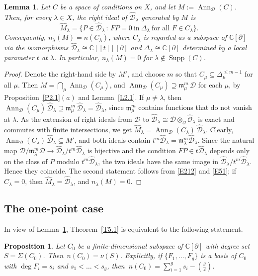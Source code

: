 \documentclass[11pt,reqno]{amsart}
\theoremstyle{plain}
\newtheorem{lemma}{Lemma}[section]
\newtheorem{proposition}{Proposition}[section]
\theoremstyle{definition}
\theoremstyle{remark}
\numberwithin{equation}{section}
\newcommand{\cD}{\mathcal{D}}
\newcommand{\cO}{\mathcal{O}}
\newcommand{\C}{\mathbb{C}}
\newcommand{\del}{\partial}
\newcommand{\fm}{\mathfrak{m}}
\newcommand{\ml}{\mathfrak{m}_\lambda}
\newcommand{\hO}{\widehat{\cO}}
\newcommand{\hD}{\widehat{\cD}}
\newcommand{\Dl}{\Delta_\lambda}
\DeclareMathOperator{\Ann}{Ann}
\DeclareMathOperator{\Supp}{Supp}
\begin{document}
\begin{lemma}
\label{L5.1}
Let $C$ be a space of conditions on $X$, and let $M := \Ann_{\cD}(C)$. Then, for every
$\lambda \in X$, the right ideal of $\hD_\lambda$ generated by $M$ is
\[
  \widehat{M}_\lambda = \{ P \in \hD_\lambda \, : \, F P = 0 \ \text{in}\ \Dl \ \text{for all } F
  \in C_\lambda \} .
\]
Consequently, $n_\lambda(M) = n(C_\lambda)$, where $C_\lambda$ is regarded as a subspace of
$\C[\del]$ via the isomorphisms $\hD_\lambda \cong \C[[t]][\del]$ and $\Dl \cong \C[\del]$
determined by a local parameter $t$ at $\lambda$. In particular, $n_\lambda(M) = 0$ for
$\lambda \notin \Supp(C)$.
\end{lemma}

\begin{proof}
Denote the right-hand side by $M'$, and choose $m$ so that $C_\mu \subseteq \Delta_\mu^{\le m-1}$
for all $\mu$. Then $M = \bigcap_\mu \Ann_{\cD}(C_\mu)$, and $\Ann_{\cD}(C_\mu) \supseteq \fm_\mu^m\, \cD$
for each $\mu$, by Proposition~\ref{P2.1}$(a)$ and Lemma~\ref{L2.1}. If
$\mu \ne \lambda$, then $\Ann_{\cD}(C_\mu)\, \hD_\lambda \supseteq \fm_\mu^m\, \hD_\lambda =
\hD_\lambda$, since $\fm_\mu^m$ contains functions that do not vanish at $\lambda$. As the
extension of right ideals from $\cD$ to $\hD_\lambda \cong \cD \otimes_{\cO} \hO_\lambda$ is
exact and commutes with finite intersections, we get $\widehat{M}_\lambda =
\Ann_{\cD}(C_\lambda)\, \hD_\lambda$. Clearly, $\Ann_{\cD}(C_\lambda)\, \hD_\lambda \subseteq M'$,
and both ideals contain $t^m \hD_\lambda = \ml^m \hD_\lambda$. Since the natural map
$\cD/\ml^m \cD \to \hD_\lambda/t^m \hD_\lambda$ is bijective and the condition $F P \in t
\hD_\lambda$ depends only on the class of $P$ modulo $t^m \hD_\lambda$, the two ideals have the
same image in $\hD_\lambda/t^m \hD_\lambda$. Hence they coincide. The second statement follows
from \eqref{E212} and \eqref{E51}; if $C_\lambda = 0$, then $\widehat{M}_\lambda = \hD_\lambda$,
and $n_\lambda(M) = 0$.
\end{proof}

\subsection{The one-point case}
\label{S5.2}
In view of Lemma~\ref{L5.1}, Theorem~\ref{T5.1} is equivalent to the following statement.

\begin{proposition}
\label{P5.1}
Let $C_0$ be a finite-dimensional subspace of $\C[\del]$ with degree set $S = \Sigma(C_0)$. Then
$\,n(C_0) = \nu(S)$. Explicitly, if $\{F_1, \ldots, F_g\}$ is a basis of $C_0$ with $\deg F_i =
s_i$ and $s_1 < \ldots < s_g$, then $\ n(C_0) = \sum_{i=1}^g s_i - \binom{g}{2}$.
\end{proposition}
\end{document}
